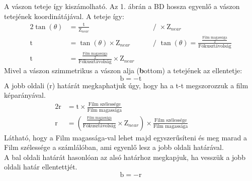 \documentclass[12pt]{article}
\begin{document}
A vászon teteje így kiszámolható. Az 1. ábrán a BD hossza egyenlő a vászon tetejének koordinátájával.
A teteje így:
\begin{alignat*}{2}
    \tan(\theta) & =\frac{\text{t}}{\text{Z}_{near}}                                                   & \quad & \text{/ }\times\text{Z}_{near}                                                      \\
    \text{t}     & =\tan(\theta)\times\text{Z}_{near}                                                  & \quad & \text{/ }\tan(\theta)=\frac{\frac{\text{Film magassága}}{2}}{\text{Fókusztávolság}} \\
    \text{t}     & =\frac{\frac{\text{Film magassága}}{2}}{\text{Fókusztávolság}}\times\text{Z}_{near} &       &
\end{alignat*}
Mivel a vászon szimmetrikus a vászon alja (\textbf{b}ottom) a tetejének az ellentetje:
\[
    \text{b}=-\text{t}
\]
A jobb oldali (r) határát megkaphatjuk úgy, hogy ha a t-t megszorozzuk a film képarányával.
\begin{alignat*}{2}
    \text{r} & = \text{t}\times\frac{\text{Film szélessége}}{\text{Film magassága}} & \quad & \\
    \text{r} & = (\frac{\frac{\text{Film magassága}}{2}}{\text{Fókusztávolság}}\times\text{Z}_{near})\times\frac{\text{Film szélessége}}{\text{Film magassága}}
\end{alignat*}
Látható, hogy a Film magassága-val lehet majd egyszerűsíteni és meg marad a Film szélessége a számlálóban, ami egyenlő lesz a jobb oldali határával. \\
A bal oldali határát hasonlóan az alsó határhoz megkapjuk, ha vesszük a jobb oldali határ ellentettjét.
\[
    \text{b}=-\text{r}
\]
\end{document}
